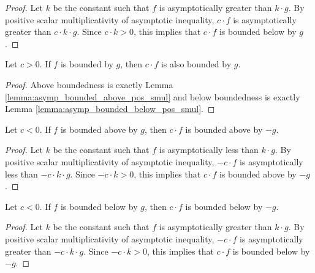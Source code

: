 \begin{proof}
    \leanok
    Let $k$ be the constant such that $f$ is asymptotically greater than $k \cdot g$.
    By positive scalar multiplicativity of asymptotic inequality, $c \cdot f$ is 
    asymptotically greater than $c \cdot k \cdot g$. Since $c \cdot k > 0$, this implies
    that $c \cdot f$ is bounded below by $g$.
\end{proof}

\begin{theorem}
    \label{thm:asymp_bounded_pos_smul}
    \leanok
    Let $c > 0$. If $f$ is bounded by $g$, then $c \cdot f$ is also bounded by $g$.
\end{theorem}

\begin{proof}
    \leanok
    Above boundedness is exactly Lemma \ref{lemma:asymp_bounded_above_pos_smul} and
    below boundedness is exactly Lemma \ref{lemma:asymp_bounded_below_pos_smul}.
\end{proof}

\begin{lemma}
    \label{lemma:asymp_bounded_above_neg_smul}
    \leanok
    Let $c < 0$. If $f$ is bounded above by $g$, then $c \cdot f$ is bounded
    above by $-g$.
\end{lemma}

\begin{proof}
    \leanok
    Let $k$ be the constant such that $f$ is asymptotically less than $k \cdot g$.
    By positive scalar multiplicativity of asymptotic inequality, $-c \cdot f$ is 
    asymptotically less than $-c \cdot k \cdot g$. Since $-c \cdot k > 0$, this implies
    that $c \cdot f$ is bounded above by $-g$.
\end{proof}

\begin{lemma}
    \label{lemma:asymp_bounded_below_neg_smul}
    \leanok
    Let $c < 0$. If $f$ is bounded below by $g$, then $c \cdot f$ is bounded
    below by $-g$.
\end{lemma}

\begin{proof}
    \leanok
    Let $k$ be the constant such that $f$ is asymptotically greater than $k \cdot g$.
    By positive scalar multiplicativity of asymptotic inequality, $-c \cdot f$ is 
    asymptotically greater than $-c \cdot k \cdot g$. Since $-c \cdot k > 0$, this implies
    that $c \cdot f$ is bounded below by $-g$.
\end{proof}


